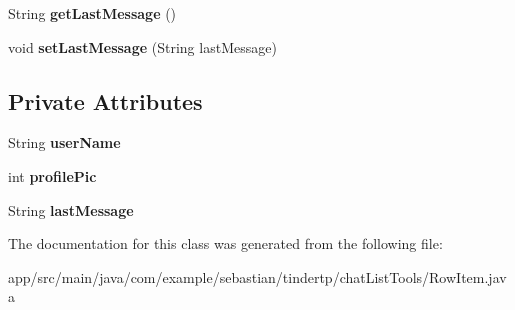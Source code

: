 \begin{DoxyCompactItemize}
\item 
String {\bfseries get\+Last\+Message} ()\hypertarget{classcom_1_1example_1_1sebastian_1_1tindertp_1_1chatListTools_1_1RowItem_a532656b126c59fc35630c4c2cff81969}{}\label{classcom_1_1example_1_1sebastian_1_1tindertp_1_1chatListTools_1_1RowItem_a532656b126c59fc35630c4c2cff81969}

\item 
void {\bfseries set\+Last\+Message} (String last\+Message)\hypertarget{classcom_1_1example_1_1sebastian_1_1tindertp_1_1chatListTools_1_1RowItem_ad39bab2a02270542eadd4b1a4080510a}{}\label{classcom_1_1example_1_1sebastian_1_1tindertp_1_1chatListTools_1_1RowItem_ad39bab2a02270542eadd4b1a4080510a}

\end{DoxyCompactItemize}
\subsection*{Private Attributes}
\begin{DoxyCompactItemize}
\item 
String {\bfseries user\+Name}\hypertarget{classcom_1_1example_1_1sebastian_1_1tindertp_1_1chatListTools_1_1RowItem_a009ce223e2fab0a2cd6539ac23cca9a9}{}\label{classcom_1_1example_1_1sebastian_1_1tindertp_1_1chatListTools_1_1RowItem_a009ce223e2fab0a2cd6539ac23cca9a9}

\item 
int {\bfseries profile\+Pic}\hypertarget{classcom_1_1example_1_1sebastian_1_1tindertp_1_1chatListTools_1_1RowItem_aa4d859833a83c90fa3cb56233a4afeac}{}\label{classcom_1_1example_1_1sebastian_1_1tindertp_1_1chatListTools_1_1RowItem_aa4d859833a83c90fa3cb56233a4afeac}

\item 
String {\bfseries last\+Message}\hypertarget{classcom_1_1example_1_1sebastian_1_1tindertp_1_1chatListTools_1_1RowItem_a99a751e104dfd7618ee9e0e5d910ba63}{}\label{classcom_1_1example_1_1sebastian_1_1tindertp_1_1chatListTools_1_1RowItem_a99a751e104dfd7618ee9e0e5d910ba63}

\end{DoxyCompactItemize}


The documentation for this class was generated from the following file\+:\begin{DoxyCompactItemize}
\item 
app/src/main/java/com/example/sebastian/tindertp/chat\+List\+Tools/Row\+Item.\+java\end{DoxyCompactItemize}
